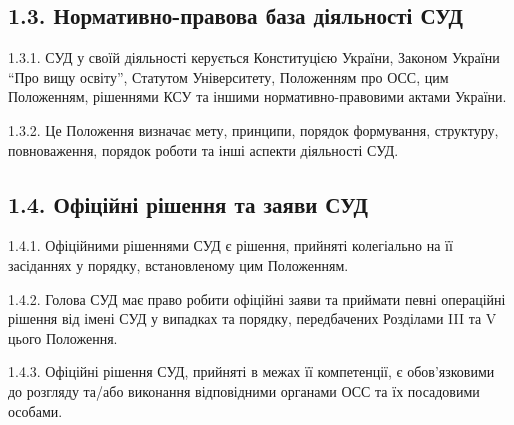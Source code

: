\subsection*{1.3. Нормативно-правова база діяльності СУД}
    1.3.1. СУД у своїй діяльності керується Конституцією України, Законом України ``Про вищу освіту'', Статутом Університету, Положенням про ОСС, цим Положенням, рішеннями КСУ та іншими нормативно-правовими актами України.

    1.3.2. Це Положення визначає мету, принципи, порядок формування, структуру, повноваження, порядок роботи та інші аспекти діяльності СУД.

\subsection*{1.4. Офіційні рішення та заяви СУД}
    1.4.1. Офіційними рішеннями СУД є рішення, прийняті колегіально на її засіданнях у порядку, встановленому цим Положенням.

    1.4.2. Голова СУД має право робити офіційні заяви та приймати певні операційні рішення від імені СУД у випадках та порядку, передбачених Розділами III та V цього Положення.

    1.4.3. Офіційні рішення СУД, прийняті в межах її компетенції, є обов'язковими до розгляду та/або виконання відповідними органами ОСС та їх посадовими особами. 